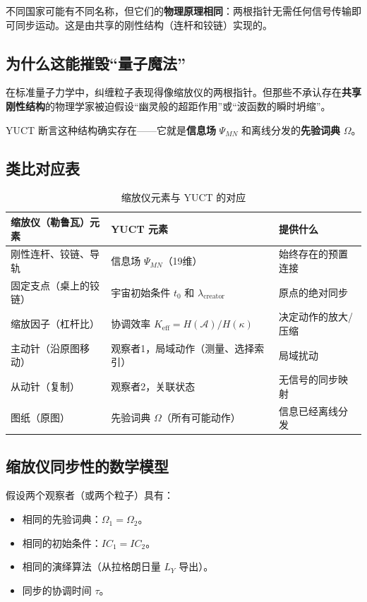 \documentclass[12pt,a4paper]{article}
\begin{document}
	不同国家可能有不同名称，但它们的\textbf{物理原理相同}：两根指针无需任何信号传输即可同步运动。这是由共享的刚性结构（连杆和铰链）实现的。
	
	\subsection{为什么这能摧毁“量子魔法”}
	
	在标准量子力学中，纠缠粒子表现得像缩放仪的两根指针。但那些不承认存在\textbf{共享刚性结构}的物理学家被迫假设“幽灵般的超距作用”或“波函数的瞬时坍缩”。
	
	YUCT 断言这种结构确实存在——它就是\textbf{信息场} \(\Psi_{MN}\) 和离线分发的\textbf{先验词典} \(\Omega\)。
	
	\subsection{类比对应表}
	
	\begin{table}[htbp]
		\centering
		\caption{缩放仪元素与 YUCT 的对应}
		\label{tab:pantograf}
		\begin{tabular}{|p{3.5cm}|p{3.5cm}|p{5.5cm}|}
			\hline
			\textbf{缩放仪（勒鲁瓦）元素} & \textbf{YUCT 元素} & \textbf{提供什么} \\
			\hline
			刚性连杆、铰链、导轨 & 信息场 \(\Psi_{MN}\)（19维） & 始终存在的预置连接 \\
			\hline
			固定支点（桌上的铰链） & 宇宙初始条件 \(t_0\) 和 \(\lambda_{\mathrm{creator}}\) & 原点的绝对同步 \\
			\hline
			缩放因子（杠杆比） & 协调效率 \(K_{\mathrm{eff}} = H(\mathcal{A})/H(\kappa)\) & 决定动作的放大/压缩 \\
			\hline
			主动针（沿原图移动） & 观察者1，局域动作（测量、选择索引） & 局域扰动 \\
			\hline
			从动针（复制） & 观察者2，关联状态 & 无信号的同步映射 \\
			\hline
			图纸（原图） & 先验词典 \(\Omega\)（所有可能动作） & 信息已经离线分发 \\
			\hline
		\end{tabular}
	\end{table}
	
	\subsection{缩放仪同步性的数学模型}
	
	假设两个观察者（或两个粒子）具有：
	\begin{itemize}
		\item 相同的先验词典：\(\Omega_1 = \Omega_2\)。
		\item 相同的初始条件：\(IC_1 = IC_2\)。
		\item 相同的演绎算法（从拉格朗日量 \(L_Y\) 导出）。
		\item 同步的协调时间 \(\tau\)。
	\end{itemize}
	
\end{document}
